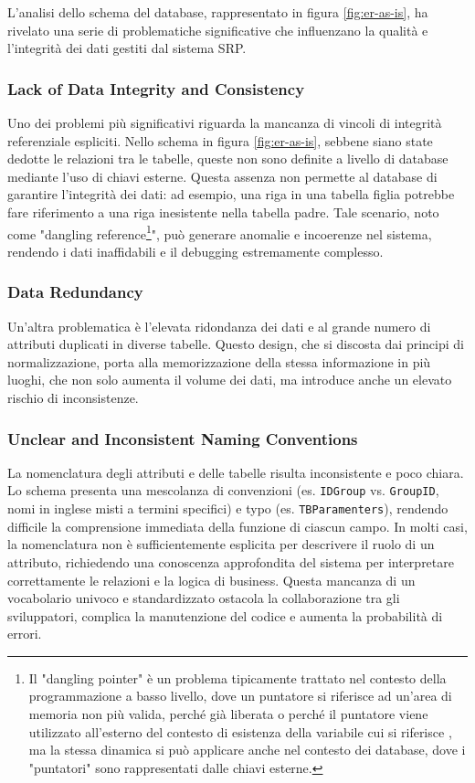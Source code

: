 L'analisi dello schema del database, rappresentato in figura \ref{fig:er-as-is}, ha rivelato una serie di problematiche significative che influenzano la qualità e l'integrità dei dati gestiti dal sistema SRP.


\subsubsection{Lack of Data Integrity and Consistency}
Uno dei problemi più significativi riguarda la mancanza di vincoli di integrità referenziale espliciti. Nello schema in figura \ref{fig:er-as-is}, sebbene siano state dedotte le relazioni tra le tabelle, queste non sono definite a livello di database mediante l'uso di chiavi esterne. Questa assenza non permette al database di garantire l'integrità dei dati: ad esempio, una riga in una tabella figlia potrebbe fare riferimento a una riga inesistente nella tabella padre. Tale scenario, noto come "dangling reference\footnote{Il "dangling pointer" è un problema tipicamente trattato nel contesto della programmazione a basso livello, dove un puntatore si riferisce ad un'area di memoria non più valida, perché già liberata o perché il puntatore viene utilizzato all'esterno del contesto di esistenza della variabile cui si riferisce \cite{apogeo-fondamenti-programmazione}, ma la stessa dinamica si può applicare anche nel contesto dei database, dove i "puntatori" sono rappresentati dalle chiavi esterne.}", può generare anomalie e incoerenze nel sistema, rendendo i dati inaffidabili e il debugging estremamente complesso.

\subsubsection{Data Redundancy}
Un'altra problematica è l'elevata ridondanza dei dati e al grande numero di attributi duplicati in diverse tabelle. Questo design, che si discosta dai principi di normalizzazione, porta alla memorizzazione della stessa informazione in più luoghi, che non solo aumenta il volume dei dati, ma introduce anche un elevato rischio di inconsistenze.

\subsubsection{Unclear and Inconsistent Naming Conventions}
La nomenclatura degli attributi e delle tabelle risulta inconsistente e poco chiara. Lo schema presenta una mescolanza di convenzioni (es. \texttt{IDGroup} vs. \texttt{GroupID}, nomi in inglese misti a termini specifici) e typo (es. \texttt{TBParamenters}), rendendo difficile la comprensione immediata della funzione di ciascun campo. In molti casi, la nomenclatura non è sufficientemente esplicita per descrivere il ruolo di un attributo, richiedendo una conoscenza approfondita del sistema per interpretare correttamente le relazioni e la logica di business. Questa mancanza di un vocabolario univoco e standardizzato ostacola la collaborazione tra gli sviluppatori, complica la manutenzione del codice e aumenta la probabilità di errori.

